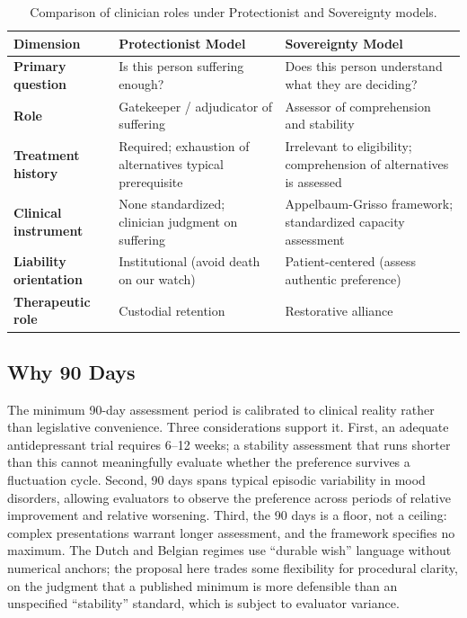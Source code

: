 \documentclass[11pt, letterpaper]{article}
\begin{document}
\begin{table}[h!]
\centering
\small
\renewcommand{\arraystretch}{1.5}
\begin{tabularx}{\textwidth}{>{\sffamily\bfseries\small}p{3.2cm} X X}
\toprule
\rowcolor{C@accent}
{\color{white}\sffamily\bfseries Dimension} &
{\color{white}\sffamily\bfseries Protectionist Model} &
{\color{white}\sffamily\bfseries Sovereignty Model} \\
\midrule
Primary question
  & Is this person suffering enough?
  & Does this person understand what they are deciding? \\
Role
  & Gatekeeper / adjudicator of suffering
  & Assessor of comprehension and stability \\
Treatment history
  & Required; exhaustion of alternatives typical prerequisite
  & Irrelevant to eligibility; comprehension of alternatives is assessed \\
Clinical instrument
  & None standardized; clinician judgment on suffering
  & Appelbaum-Grisso framework; standardized capacity assessment \\
Liability orientation
  & Institutional (avoid death on our watch)
  & Patient-centered (assess authentic preference) \\
Therapeutic role
  & Custodial retention
  & Restorative alliance \\
\bottomrule
\end{tabularx}
\caption{Comparison of clinician roles under Protectionist and Sovereignty models.}
\end{table}

\subsection{Why 90 Days}

The minimum 90-day assessment period is calibrated to clinical reality rather than
legislative convenience. Three considerations support it. First, an adequate
antidepressant trial requires 6--12 weeks; a stability assessment that runs shorter
than this cannot meaningfully evaluate whether the preference survives a fluctuation
cycle. Second, 90 days spans typical episodic variability in mood disorders, allowing
evaluators to observe the preference across periods of relative improvement and
relative worsening. Third, the 90 days is a floor, not a ceiling: complex presentations
warrant longer assessment, and the framework specifies no maximum. The Dutch and
Belgian regimes use ``durable wish'' language without numerical anchors; the proposal
here trades some flexibility for procedural clarity, on the judgment that a published
minimum is more defensible than an unspecified ``stability'' standard, which is
subject to evaluator variance.
\end{document}
